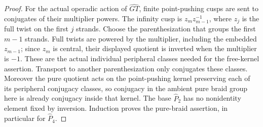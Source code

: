 \documentclass[11pt]{article}
\begin{document}
\begin{proof}
For the actual operadic action of $\widehat{GT}$, finite
point-pushing cusps are sent to conjugates of their
multiplier powers.  The infinity cusp is
$z_m z_{m-1}^{-1}$, where $z_j$ is the full twist on
the first $j$ strands.  Choose the parenthesization that
groups the first $m-1$ strands.  Full twists are powered
by the multiplier, including the embedded $z_{m-1}$;
since $z_m$ is central, their displayed quotient is
inverted when the multiplier is $-1$.  These are the
actual individual peripheral classes needed for the
free-kernel assertion.  Transport to another
parenthesization only conjugates these classes.
Moreover the pure quotient acts on the point-pushing
kernel preserving each of its peripheral conjugacy
classes, so conjugacy in the ambient pure braid group
here is already conjugacy inside that kernel.
The base
$\widehat P_2$ has no nonidentity element fixed by
inversion.  Induction proves the pure-braid assertion,
in particular for $\widehat P_4$.
\end{proof}
\end{document}
